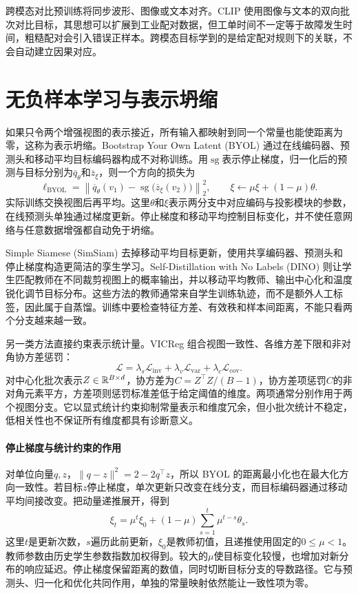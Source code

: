 跨模态对比预训练将同步波形、图像或文本对齐。CLIP 使用图像与文本的双向批次对比目标\cite{radford2021clip}，其思想可以扩展到工业配对数据，但工单时间不一定等于故障发生时间，粗糙配对会引入错误正样本。跨模态目标学到的是给定配对规则下的关联，不会自动建立因果对应。

\section{无负样本学习与表示坍缩}
如果只令两个增强视图的表示接近，所有输入都映射到同一个常量也能使距离为零，这称为表示坍缩。Bootstrap Your Own Latent (BYOL) 通过在线编码器、预测头和移动平均目标编码器构成不对称训练\cite{grill2020byol}。用$\operatorname{sg}$表示停止梯度，归一化后的预测与目标分别为$\overline q_\theta$和$\overline z_\xi$，则一个方向的损失为
\begin{equation}
 \ell_{\mathrm{BYOL}}=
 \left\|\overline q_\theta(v_1)
 -\operatorname{sg}\bigl(\overline z_\xi(v_2)\bigr)\right\|_2^2,
 \qquad \xi\leftarrow\mu\xi+(1-\mu)\theta.
\end{equation}
实际训练交换视图后再平均。这里$\theta$和$\xi$表示两分支中对应编码与投影模块的参数，在线预测头单独通过梯度更新。停止梯度和移动平均控制目标变化，并不使任意网络与任意数据增强都自动免于坍缩。

Simple Siamese (SimSiam) 去掉移动平均目标更新，使用共享编码器、预测头和停止梯度构造更简洁的孪生学习\cite{chen2021simsiam}。Self-Distillation with No Labels (DINO) 则让学生匹配教师在不同裁剪视图上的概率输出，并以移动平均教师、输出中心化和温度锐化调节目标分布\cite{caron2021dino}。这些方法的教师通常来自学生训练轨迹，而不是额外人工标签，因此属于自蒸馏。训练中要检查特征方差、有效秩和样本间距离，不能只看两个分支越来越一致。

另一类方法直接约束表示统计量。VICReg 组合视图一致性、各维方差下限和非对角协方差惩罚\cite{bardes2022vicreg}：
\begin{equation}
 \mathcal L=\lambda_s\mathcal L_{\mathrm{inv}}
 +\lambda_v\mathcal L_{\mathrm{var}}
 +\lambda_c\mathcal L_{\mathrm{cov}}.
\end{equation}
对中心化批次表示$Z\in\mathbb{R}^{B\times d}$，协方差为$C=Z^\top Z/(B-1)$，协方差项惩罚$C$的非对角元素平方，方差项则惩罚标准差低于给定阈值的维度。两项通常分别作用于两个视图分支。它以显式统计约束抑制常量表示和维度冗余，但小批次统计不稳定，低相关性也不保证所有维度都具有诊断意义。

\paragraph{停止梯度与统计约束的作用}
对单位向量$q,z$，$\|q-z\|^2=2-2q^\top z$，所以 BYOL 的距离最小化也在最大化方向一致性。若目标$z$停止梯度，单次更新只改变在线分支，而目标编码器通过移动平均间接改变。把动量递推展开，得到
\begin{equation}
 \xi_t=\mu^t\xi_0+(1-\mu)\sum_{s=1}^t\mu^{t-s}\theta_s.
\end{equation}
这里$t$是更新次数，$s$遍历此前更新，$\xi_0$是教师初值，且递推使用固定的$0\leq\mu<1$。教师参数由历史学生参数指数加权得到。较大的$\mu$使目标变化较慢，也增加对新分布的响应延迟。停止梯度保留距离的数值，同时切断目标分支的导数路径。它与预测头、归一化和优化共同作用，单独的常量映射依然能让一致性项为零。

